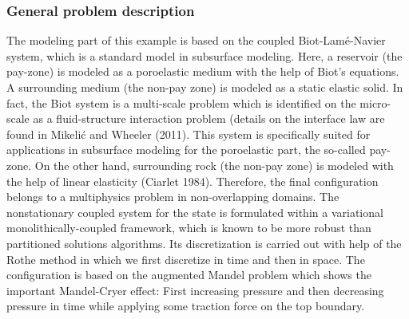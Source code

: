 \subsubsection{General problem description}
The modeling part of this example is based on the coupled
Biot-Lam\'e-Navier system, 
which is a standard model in subsurface modeling. 
Here, a reservoir (the
pay-zone) is modeled as a poroelastic medium with the help of Biot's
equations. A surrounding medium (the non-pay zone) is modeled as a static
elastic solid. 
In fact, the
Biot system is a multi-scale problem which 
is identified on the micro-scale as 
a fluid-structure interaction problem (details on the 
interface law are found in Mikeli\'c and Wheeler (2011). 
This system 
is specifically suited for applications 
in subsurface modeling for the poroelastic part, the 
so-called pay-zone.  
On the other hand, surrounding rock 
(the non-pay zone) 
is modeled with the help of linear elasticity (Ciarlet 1984). 
Therefore, the final configuration 
belongs to a multiphysics problem in non-overlapping domains.
The nonstationary coupled system for the state is formulated 
within a variational monolithically-coupled framework, 
which is known 
to be more robust than partitioned solutions algorithms.
Its discretization 
is carried out with help of the Rothe method in which we first 
discretize in time and then in space. 
The configuration 
is based on the augmented Mandel problem which 
shows the important Mandel-Cryer effect: First increasing pressure
and then decreasing pressure in time while applying some 
traction force on the top boundary. 

